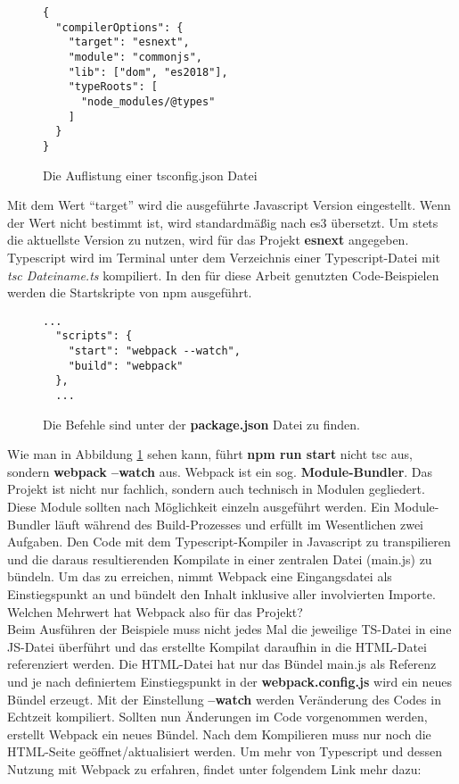 \begin{figure}[H]
\begin{lstlisting}[basicstyle=\small]
{
  "compilerOptions": {
    "target": "esnext",
    "module": "commonjs",
    "lib": ["dom", "es2018"],
    "typeRoots": [
      "node_modules/@types"
    ]
  }
}
\end{lstlisting}
\caption{Die Auflistung einer tsconfig.json Datei}
\end{figure}

\noindent
Mit dem Wert “target” wird die ausgeführte Javascript Version eingestellt. Wenn der Wert nicht bestimmt ist, wird standardmäßig nach es3 übersetzt. Um stets die aktuellste Version zu nutzen, wird für das Projekt \textbf{esnext} angegeben. Typescript wird im Terminal unter dem Verzeichnis einer Typescript-Datei mit \textit{tsc Dateiname.ts} kompiliert. In den für diese Arbeit genutzten Code-Beispielen werden die Startskripte von npm ausgeführt.

\begin{figure}[H]
\begin{lstlisting}[basicstyle=\small]
  ...
  "scripts": {
    "start": "webpack --watch",
    "build": "webpack"
  },
  ...
\end{lstlisting}
\caption{Die Befehle sind unter der \textbf{package.json} Datei zu finden.}
\label{npm-ex-script}
\end{figure}

\noindent
Wie man in Abbildung \ref{npm-ex-script} sehen kann, führt \textbf{npm run start} nicht tsc aus, sondern \textbf{webpack --watch} aus. Webpack ist ein sog. \textbf{Module-Bundler}. Das Projekt ist nicht nur fachlich, sondern auch technisch in Modulen gegliedert. Diese Module sollten nach Möglichkeit einzeln ausgeführt werden. Ein Module-Bundler läuft während des Build-Prozesses und erfüllt im Wesentlichen zwei Aufgaben. Den Code mit dem Typescript-Kompiler in Javascript zu transpilieren und die daraus resultierenden Kompilate in einer zentralen Datei (main.js) zu bündeln. Um das zu erreichen, nimmt Webpack eine Eingangsdatei als Einstiegspunkt an und bündelt den Inhalt inklusive aller involvierten Importe. Welchen Mehrwert hat Webpack also für das Projekt? \\

\noindent
Beim Ausführen der Beispiele muss nicht jedes Mal die jeweilige TS-Datei in eine JS-Datei überführt und das erstellte Kompilat daraufhin in die HTML-Datei referenziert werden. Die HTML-Datei hat nur das Bündel main.js als Referenz und je nach definiertem Einstiegspunkt in der \textbf{webpack.config.js} wird ein neues Bündel erzeugt. Mit der Einstellung \textbf{--watch} werden Veränderung des Codes in Echtzeit kompiliert. Sollten nun Änderungen im Code vorgenommen werden, erstellt Webpack ein neues Bündel. Nach dem Kompilieren muss nur noch die HTML-Seite geöffnet/aktualisiert werden. Um mehr von Typescript und dessen Nutzung mit Webpack zu erfahren, findet unter folgendem Link mehr dazu:

